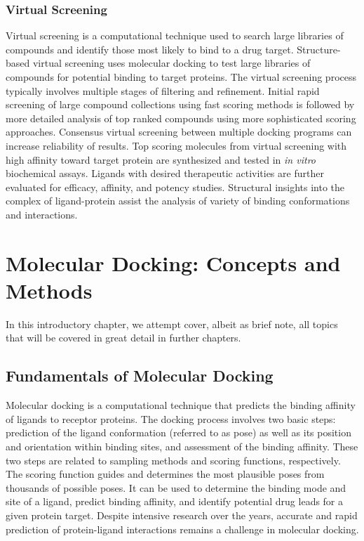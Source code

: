 \documentclass[12pt, a4paper]{article}
\begin{document}
\subsubsection{Virtual Screening}
Virtual screening is a computational technique used to search large libraries of compounds and identify those most likely to bind to a drug target. Structure-based virtual screening uses molecular docking to test large libraries of compounds for potential binding to target proteins. The virtual screening process typically involves multiple stages of filtering and refinement. Initial rapid screening of large compound collections using fast scoring methods is followed by more detailed analysis of top ranked compounds using more sophisticated scoring approaches. Consensus virtual screening between multiple docking programs can increase reliability of results. Top scoring molecules from virtual screening with high affinity toward target protein are synthesized and tested in \textit{in vitro} biochemical assays. Ligands with desired therapeutic activities are further evaluated for efficacy, affinity, and potency studies. Structural insights into the complex of ligand-protein assist the analysis of variety of binding conformations and interactions.


\section{Molecular Docking: Concepts and Methods}
In this introductory chapter, we attempt cover, albeit as brief note, all topics that will be covered in great detail in further chapters.

\subsection{Fundamentals of Molecular Docking}
Molecular docking is a computational technique that predicts the binding affinity of ligands to receptor proteins. The docking process involves two basic steps: prediction of the ligand conformation (referred to as pose) as well as its position and orientation within binding sites,  and assessment of the binding affinity. These two steps are related to sampling methods and scoring functions, respectively. The scoring function guides and determines the most plausible poses from thousands of possible poses. It can be used to determine the binding mode and site of a ligand, predict binding affinity, and identify potential drug leads for a given protein target. Despite intensive research over the years, accurate and rapid prediction of protein-ligand interactions remains a challenge in molecular docking.
\end{document}
